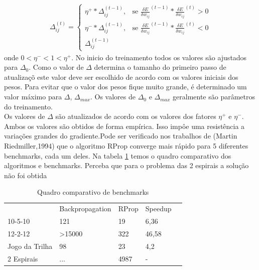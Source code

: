 \documentclass[
	article,			%
	11pt,				%
	oneside,			%
	a4paper,			%
	english,			%
	brazil,				%
	sumario=tradicional
	]{abntex2}
\begin{document}
\begin{align}
\Delta^{(t)}_{ij} = 
\begin{cases} 
		\eta^+*\Delta_{ij}^{(t-1)}, & \mbox{se } 
		\frac{\delta E}{\delta w_{ij}}^{(t-1)}*
		\frac{\delta E}{\delta w_{ij}}^{(t)} >0
		\\
		\eta^-*\Delta_{ij}^{(t-1)}, & \mbox{se } 
		\frac{\delta E}{\delta w_{ij}}^{(t-1)}*
		\frac{\delta E}{\delta w_{ij}}^{(t)} <0 \\
		\Delta_{ij}^{(t-1)}
\end{cases}
\end{align}
onde
$0<\eta^-<1<\eta^+$.
No inicio do treinamento todos os valores são ajustados para $\Delta_0$. Como o
valor de $\Delta$ determina o tamanho do primeiro passo de atualizaçõ este
valor deve ser escolhido de acordo com os valores iniciais dos pesos.
Para evitar que o valor dos pesos fique muito grande, é determinado um valor
máximo para $\Delta$, $\Delta_{max}$. Os valores de $\Delta_0$ e $\Delta_{max}$
geralmente são parâmetros do treinamento.
\newline
\\
    Os valores de $\Delta$ são atualizados de acordo com os valores dos
fatores $\eta^+$ e $\eta^-$. Ambos os valores são obtidos de forma empírica. Isso impôe
uma resistência a variações grandes do gradiente.Pode ser verificado
nos trabalhos de (Martin Riedmiller,1994) que o algoritmo RProp converge mais
rápido para 5 diferentes benchmarks, cada um deles. Na tabela \ref{tab:bench}
temos o quadro comparativo dos algoritmos e benchmarks. Perceba que para o
problema das 2 espirais a solução não foi obtida

\begin{table}[h]
\centering
\begin{tabular}{|l|l|l|l|l}
\cline{1-4}
               & Backpropagation   & RProp & Speedup &  \\ \cline{1-4}
10-5-10        & 121               & 19    &    6,36     &  \\ \cline{1-4}
12-2-12        & \textgreater15000 & 322   &   46,58      &  \\ \cline{1-4}
Jogo da Trilha & 98                & 23    &    4,2     &  \\ \cline{1-4}
2 Espirais     & ...               & 4987  &    -     &  \\ \cline{1-4}
\end{tabular}
\caption{Quadro comparativo de benchmarks}
\label{tab:bench}
\end{table}
\end{document}
